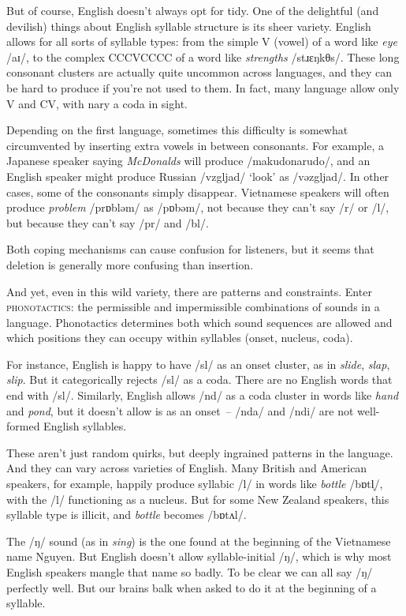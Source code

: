 But of course, English doesn't always opt for tidy. One of the delightful (and devilish) things about English syllable structure is its sheer variety. English allows for all sorts of syllable types: from the simple V (vowel) of a word like \textit{eye} /aɪ/, to the complex CCCVCCCC of a word like \textit{strengths} /stɹɛŋkθs/. These long consonant clusters are actually quite uncommon across languages, and they can be hard to produce if you're not used to them. In fact, many language allow only V and CV, with nary a coda in sight.

Depending on the first language, sometimes this difficulty is somewhat circumvented by inserting extra vowels in between consonants. For example, a Japanese speaker saying \textit{McDonalds} will produce /makudonarudo/, and an English speaker might produce Russian /vzgljad/ `look' as /vəzgljad/. In other cases, some of the consonants simply disappear. Vietnamese speakers will often produce \textit{problem} /prɒbləm/ as /pɒbəm/, not because they can't say /r/ or /l/, but because they can't say /pr/ and /bl/.

Both coping mechanisms can cause confusion for listeners, but it seems that deletion is generally more confusing than insertion.

And yet, even in this wild variety, there are patterns and constraints. Enter \textsc{phonotactics}: the permissible and impermissible combinations of sounds in a language. Phonotactics determines both which sound sequences are allowed and which positions they can occupy within syllables (onset, nucleus, coda).

For instance, English is happy to have /sl/ as an onset cluster, as in \textit{slide}, \textit{slap}, \textit{slip}. But it categorically rejects /sl/ as a coda. There are no English words that end with /sl/. Similarly, English allows /nd/ as a coda cluster in words like \textit{hand} and \textit{pond}, but it doesn't allow is as an onset~-- /nda/ and /ndi/ are not well-formed English syllables.

These aren't just random quirks, but deeply ingrained patterns in the language. And they can vary across varieties of English. Many British and American speakers, for example, happily produce syllabic /l/ in words like \textit{bottle} /bɒtl̩/, with the /l/ functioning as a nucleus. But for some New Zealand speakers, this syllable type is illicit, and \textit{bottle} becomes /bɒtʌl/.

The /ŋ/ sound (as in \textit{sing}) is the one found at the beginning of the Vietnamese name Nguyen. But English doesn't allow syllable-initial /ŋ/, which is why most English speakers mangle that name so badly. To be clear we can all say /ŋ/ perfectly well. But our brains balk when asked to do it at the beginning of a syllable.

